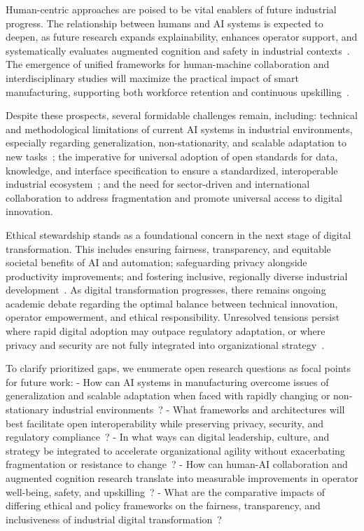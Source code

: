 \documentclass[sigconf]{acmart}
\begin{document}
Human-centric approaches are poised to be vital enablers of future industrial progress. The relationship between humans and AI systems is expected to deepen, as future research expands explainability, enhances operator support, and systematically evaluates augmented cognition and safety in industrial contexts~\cite{ref45}\cite{ref83}. The emergence of unified frameworks for human-machine collaboration and interdisciplinary studies will maximize the practical impact of smart manufacturing, supporting both workforce retention and continuous upskilling~\cite{ref86}\cite{ref94}.

Despite these prospects, several formidable challenges remain, including: technical and methodological limitations of current AI systems in industrial environments, especially regarding generalization, non-stationarity, and scalable adaptation to new tasks~\cite{ref19}\cite{ref20}\cite{ref54}; the imperative for universal adoption of open standards for data, knowledge, and interface specification to ensure a standardized, interoperable industrial ecosystem~\cite{ref13}\cite{ref86}; and the need for sector-driven and international collaboration to address fragmentation and promote universal access to digital innovation.

Ethical stewardship stands as a foundational concern in the next stage of digital transformation. This includes ensuring fairness, transparency, and equitable societal benefits of AI and automation; safeguarding privacy alongside productivity improvements; and fostering inclusive, regionally diverse industrial development~\cite{ref35}\cite{ref41}\cite{ref90}. As digital transformation progresses, there remains ongoing academic debate regarding the optimal balance between technical innovation, operator empowerment, and ethical responsibility. Unresolved tensions persist where rapid digital adoption may outpace regulatory adaptation, or where privacy and security are not fully integrated into organizational strategy~\cite{ref35}\cite{ref41}.

To clarify prioritized gaps, we enumerate open research questions as focal points for future work:
- How can AI systems in manufacturing overcome issues of generalization and scalable adaptation when faced with rapidly changing or non-stationary industrial environments~\cite{ref19}\cite{ref20}\cite{ref54}?
- What frameworks and architectures will best facilitate open interoperability while preserving privacy, security, and regulatory compliance~\cite{ref13}\cite{ref86}?
- In what ways can digital leadership, culture, and strategy be integrated to accelerate organizational agility without exacerbating fragmentation or resistance to change~\cite{ref93}?
- How can human-AI collaboration and augmented cognition research translate into measurable improvements in operator well-being, safety, and upskilling~\cite{ref45}\cite{ref83}?
- What are the comparative impacts of differing ethical and policy frameworks on the fairness, transparency, and inclusiveness of industrial digital transformation~\cite{ref35}\cite{ref41}\cite{ref90}?
\end{document}
